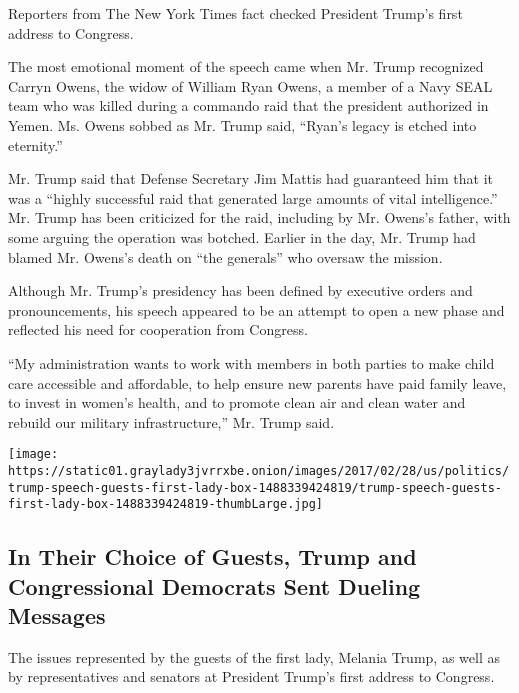 Reporters from The New York Times fact checked President Trump's first
address to Congress.

The most emotional moment of the speech came when Mr. Trump recognized
Carryn Owens, the widow of William Ryan Owens, a member of a Navy SEAL
team who was killed during a commando raid that the president authorized
in Yemen. Ms. Owens sobbed as Mr. Trump said, ``Ryan's legacy is etched
into eternity.''

Mr. Trump said that Defense Secretary Jim Mattis had guaranteed him that
it was a ``highly successful raid that generated large amounts of vital
intelligence.'' Mr. Trump has been criticized for the raid, including by
Mr. Owens's father, with some arguing the operation was botched. Earlier
in the day, Mr. Trump had blamed Mr. Owens's death on ``the generals''
who oversaw the mission.

Although Mr. Trump's presidency has been defined by executive orders and
pronouncements, his speech appeared to be an attempt to open a new phase
and reflected his need for cooperation from Congress.

``My administration wants to work with members in both parties to make
child care accessible and affordable, to help ensure new parents have
paid family leave, to invest in women's health, and to promote clean air
and clean water and rebuild our military infrastructure,'' Mr. Trump
said.

\href{https://www.nytimes3xbfgragh.onion/interactive/2017/02/28/us/politics/in-their-choice-of-guests-trump-and-congressional-democrats-sent-dueling-messages.html}{}

\texttt{[image: https://static01.graylady3jvrrxbe.onion/images/2017/02/28/us/politics/trump-speech-guests-first-lady-box-1488339424819/trump-speech-guests-first-lady-box-1488339424819-thumbLarge.jpg]}

\hypertarget{in-their-choice-of-guests-trump-and-congressional-democrats-sent-dueling-messages}{%
\subsection{In Their Choice of Guests, Trump and Congressional Democrats
Sent Dueling
Messages}\label{in-their-choice-of-guests-trump-and-congressional-democrats-sent-dueling-messages}}

The issues represented by the guests of the first lady, Melania Trump,
as well as by representatives and senators at President Trump's first
address to Congress.

